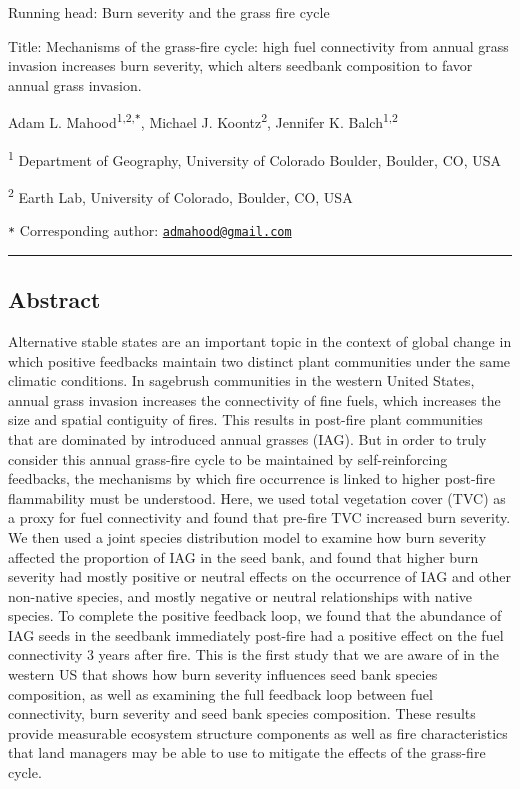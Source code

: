 \documentclass[
  12pt,
]{article}
\author{}
\date{\vspace{-2.5em}}
\begin{document}

Running head: Burn severity and the grass fire cycle

Title: Mechanisms of the grass-fire cycle: high fuel connectivity from
annual grass invasion increases burn severity, which alters seedbank
composition to favor annual grass invasion.

Adam L. Mahood\textsuperscript{1,2,\texttt{*}}, Michael J.
Koontz\textsuperscript{2}, Jennifer K. Balch\textsuperscript{1,2}

\small

\textsuperscript{1} Department of Geography, University of Colorado
Boulder, Boulder, CO, USA

\textsuperscript{2} Earth Lab, University of Colorado, Boulder, CO, USA

\texttt{*} Corresponding author:
\href{mailto:admahood@gmail.com}{\nolinkurl{admahood@gmail.com}}

\normalsize

\newpage

\hrule

\linenumbers

\hypertarget{abstract}{%
\subsection{Abstract}\label{abstract}}

Alternative stable states are an important topic in the context of
global change in which positive feedbacks maintain two distinct plant
communities under the same climatic conditions. In sagebrush communities
in the western United States, annual grass invasion increases the
connectivity of fine fuels, which increases the size and spatial
contiguity of fires. This results in post-fire plant communities that
are dominated by introduced annual grasses (IAG). But in order to truly
consider this annual grass-fire cycle to be maintained by
self-reinforcing feedbacks, the mechanisms by which fire occurrence is
linked to higher post-fire flammability must be understood. Here, we
used total vegetation cover (TVC) as a proxy for fuel connectivity and
found that pre-fire TVC increased burn severity. We then used a joint
species distribution model to examine how burn severity affected the
proportion of IAG in the seed bank, and found that higher burn severity
had mostly positive or neutral effects on the occurrence of IAG and
other non-native species, and mostly negative or neutral relationships
with native species. To complete the positive feedback loop, we found
that the abundance of IAG seeds in the seedbank immediately post-fire
had a positive effect on the fuel connectivity 3 years after fire. This
is the first study that we are aware of in the western US that shows how
burn severity influences seed bank species composition, as well as
examining the full feedback loop between fuel connectivity, burn
severity and seed bank species composition. These results provide
measurable ecosystem structure components as well as fire
characteristics that land managers may be able to use to mitigate the
effects of the grass-fire cycle.
\end{document}
